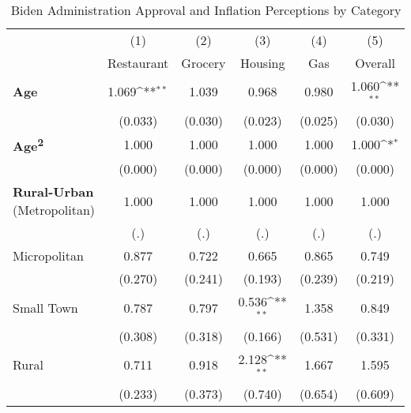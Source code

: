 \begin{table}[htbp]\centering
\def\sym#1{\ifmmode^{#1}\else\(^{#1}\)\fi}
\caption{Biden Administration Approval and Inflation Perceptions by Category}
\begin{tabular}{l*{5}{c}}
\hline\hline
                    &\multicolumn{1}{c}{(1)}&\multicolumn{1}{c}{(2)}&\multicolumn{1}{c}{(3)}&\multicolumn{1}{c}{(4)}&\multicolumn{1}{c}{(5)}\\
                    &\multicolumn{1}{c}{Restaurant}&\multicolumn{1}{c}{Grocery}&\multicolumn{1}{c}{Housing}&\multicolumn{1}{c}{Gas}&\multicolumn{1}{c}{Overall}\\
\hline
\textbf{Age}        &       1.069\sym{**} &       1.039         &       0.968         &       0.980         &       1.060\sym{**} \\
                    &     (0.033)         &     (0.030)         &     (0.023)         &     (0.025)         &     (0.030)         \\
\textbf{Age\textsuperscript{2}}&       1.000         &       1.000         &       1.000         &       1.000         &       1.000\sym{*}  \\
                    &     (0.000)         &     (0.000)         &     (0.000)         &     (0.000)         &     (0.000)         \\
\textbf{Rural-Urban} (Metropolitan)&       1.000         &       1.000         &       1.000         &       1.000         &       1.000         \\
                    &         (.)         &         (.)         &         (.)         &         (.)         &         (.)         \\
Micropolitan        &       0.877         &       0.722         &       0.665         &       0.865         &       0.749         \\
                    &     (0.270)         &     (0.241)         &     (0.193)         &     (0.239)         &     (0.219)         \\
Small Town          &       0.787         &       0.797         &       0.536\sym{**} &       1.358         &       0.849         \\
                    &     (0.308)         &     (0.318)         &     (0.166)         &     (0.531)         &     (0.331)         \\
Rural               &       0.711         &       0.918         &       2.128\sym{**} &       1.667         &       1.595         \\
                    &     (0.233)         &     (0.373)         &     (0.740)         &     (0.654)         &     (0.609)         \\

\end{tabular}
\end{table}
